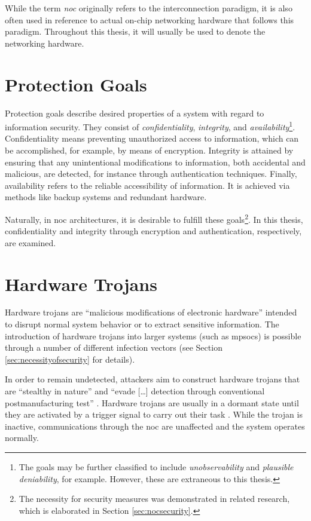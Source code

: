 While the term \textit{\gls{noc}} originally refers to the interconnection paradigm, it is also often used in reference to actual on-chip networking
hardware that follows this paradigm. Throughout this thesis, it will usually be used to denote the networking hardware.

\section{Protection Goals}\label{sec:protectiongoals}
Protection goals describe desired properties of a system with regard to information security. They consist of \textit{confidentiality},
\textit{integrity}, and \textit{availability}\footnote{The goals may be further classified to include \textit{unobservability} and \textit{plausible
deniability}, for example. However, these are extraneous to this thesis.}. Confidentiality means preventing unauthorized access to information, which
can be accomplished, for example, by means of encryption. Integrity is attained by ensuring that any unintentional modifications to information, both accidental and
malicious, are detected, for instance through authentication techniques. Finally, availability refers to the reliable accessibility of information. It is
achieved via methods like backup systems and redundant hardware.

Naturally, in \gls{noc} architectures, it is desirable to fulfill these goals\footnote{The necessity for security measures was demonstrated in
related research, which is elaborated in Section \ref{sec:nocsecurity}.}. In this thesis, confidentiality and integrity through encryption and
authentication, respectively, are examined.

\section{Hardware Trojans}\label{sec:hardwaretrojans}
Hardware trojans are \enquote{malicious modifications of electronic hardware} \cite[1]{bhunia14hardwaretrojans} intended to disrupt normal
system behavior or to extract sensitive information. The introduction of hardware trojans into larger systems (such as \glspl{mpsoc}) is possible
through a number of different infection vectors (see Section \ref{sec:necessityofsecurity} for details).

In order to remain undetected, attackers aim to construct hardware trojans that are \enquote{stealthy in nature} \cite[1]{bhunia14hardwaretrojans}
and \enquote{evade […] detection through conventional postmanufacturing test} \cite[1]{bhunia14hardwaretrojans}. Hardware trojans are usually in a
dormant state until they are activated by a trigger signal to carry out their task \cites{bhunia14hardwaretrojans}{ancajas14fortnocs}. While the
trojan is inactive, communications through the \gls{noc} are unaffected and the system operates normally.

